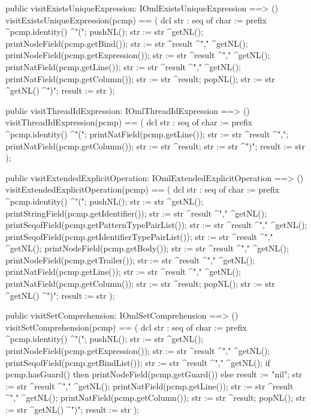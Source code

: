 \begin{vdm_al}
  public visitExistsUniqueExpression: IOmlExistsUniqueExpression ==> ()
  visitExistsUniqueExpression(pcmp) ==
    ( dcl str : seq of char := prefix ^pcmp.identity() ^"(";
      pushNL();
      str := str ^getNL();
      printNodeField(pcmp.getBind());
      str := str ^result ^"," ^getNL();
      printNodeField(pcmp.getExpression());
      str := str ^result ^"," ^getNL();
      printNatField(pcmp.getLine());
      str := str ^result ^"," ^getNL();
      printNatField(pcmp.getColumn());
      str := str ^result;
      popNL();
      str := str ^getNL() ^")";
      result := str );

  public visitThreadIdExpression: IOmlThreadIdExpression ==> ()
  visitThreadIdExpression(pcmp) ==
    ( dcl str : seq of char := prefix ^pcmp.identity() ^"(";
      printNatField(pcmp.getLine());
      str := str ^result ^",";
      printNatField(pcmp.getColumn());
      str := str ^result;
      str := str ^")";
      result := str );

  public visitExtendedExplicitOperation: IOmlExtendedExplicitOperation ==> ()
  visitExtendedExplicitOperation(pcmp) ==
    ( dcl str : seq of char := prefix ^pcmp.identity() ^"(";
      pushNL();
      str := str ^getNL();
      printStringField(pcmp.getIdentifier());
      str := str ^result ^"," ^getNL();
      printSeqofField(pcmp.getPatternTypePairList());
      str := str ^result ^"," ^getNL();
      printSeqofField(pcmp.getIdentifierTypePairList());
      str := str ^result ^"," ^getNL();
      printNodeField(pcmp.getBody());
      str := str ^result ^"," ^getNL();
      printNodeField(pcmp.getTrailer());
      str := str ^result ^"," ^getNL();
      printNatField(pcmp.getLine());
      str := str ^result ^"," ^getNL();
      printNatField(pcmp.getColumn());
      str := str ^result;
      popNL();
      str := str ^getNL() ^")";
      result := str );

  public visitSetComprehension: IOmlSetComprehension ==> ()
  visitSetComprehension(pcmp) ==
    ( dcl str : seq of char := prefix ^pcmp.identity() ^"(";
      pushNL();
      str := str ^getNL();
      printNodeField(pcmp.getExpression());
      str := str ^result ^"," ^getNL();
      printSeqofField(pcmp.getBindList());
      str := str ^result ^"," ^getNL();
      if pcmp.hasGuard()
      then printNodeField(pcmp.getGuard())
      else result := "nil";
      str := str ^result ^"," ^getNL();
      printNatField(pcmp.getLine());
      str := str ^result ^"," ^getNL();
      printNatField(pcmp.getColumn());
      str := str ^result;
      popNL();
      str := str ^getNL() ^")";
      result := str );


\end{vdm_al}
